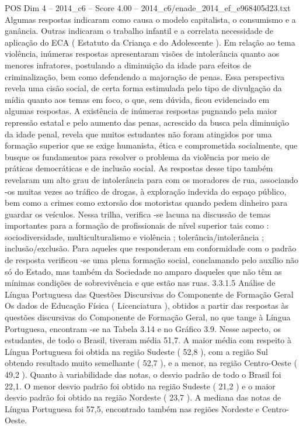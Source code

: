 \begin{textsample}{POS Dim 4 – 2014\_c6 – Score 4.00 – 2014\_c6/enade\_2014\_ef\_e968405d23.txt}
Algumas respostas indicaram como causa o modelo capitalista, o consumismo e a ganância.
Outras indicaram o trabalho infantil e a correlata necessidade de aplicação do ECA ( Estatuto da Criança e do Adolescente ).
Em relação ao tema violência, inúmeras respostas apresentaram visões de intolerância quanto aos menores infratores, postulando a diminuição da idade para efeitos de criminalização, bem como defendendo a majoração de penas.
Essa perspectiva revela uma cisão social, de certa forma estimulada pelo tipo de divulgação da mídia quanto aos temas em foco, o que, sem dúvida, ficou evidenciado em algumas respostas.
A existência de inúmeras respostas pugnando pela maior repressão estatal e pelo aumento das penas, acrescido da busca pela diminuição da idade penal, revela que muitos estudantes não foram atingidos por uma formação superior que se exige humanista, ética e comprometida socialmente, que busque os fundamentos para resolver o problema da violência por meio de práticas democráticas e de inclusão social.
As respostas desse tipo também revelaram um alto grau de intolerância para com os moradores de rua, associando -os muitas vezes ao tráfico de drogas, à exploração indevida do espaço público, bem como a crimes como extorsão dos motoristas quando pedem dinheiro para guardar os veículos.
Nessa trilha, verifica -se lacuna na discussão de temas importantes para a formação de profissionais de nível superior tais como : sociodiversidade, multiculturalismo e violência ; tolerância/intolerância ; inclusão/exclusão.
Para aqueles que responderam em conformidade com o padrão de resposta verificou -se uma plena formação social, conclamando pelo auxílio não só do Estado, mas também da Sociedade no amparo daqueles que não têm as mínimas condições de sobrevivência e que estão nas ruas. 3.3.1.5 Análise de Língua Portuguesa das Questões Discursivas do Componente de Formação Geral Os dados de Educação Física ( Licenciatura ), obtidos a partir das respostas às questões discursivas do Componente de Formação Geral, no que tange à Língua Portuguesa, encontram -se na Tabela 3.14 e no Gráfico 3.9.
Nesse aspecto, os estudantes, de todo o Brasil, tiveram média 51,7.
A maior média com respeito à Língua Portuguesa foi obtida na região Sudeste ( 52,8 ), com a região Sul obtendo resultado muito semelhante ( 52,7 ), e a menor, na região Centro-Oeste ( 49,2 ).
Quanto à variabilidade das notas, o desvio padrão de todo o Brasil foi 22,1.
O menor desvio padrão foi obtido na região Sudeste ( 21,2 ) e o maior desvio padrão foi obtido na região Nordeste ( 23,7 ).
A mediana das notas de Língua Portuguesa foi 57,5, encontrado também nas regiões Nordeste e Centro-Oeste.

\end{textsample}
